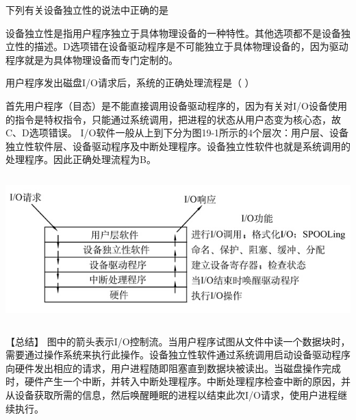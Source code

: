 \question 下列有关设备独立性的说法中正确的是
\par{}
\begin{solution}设备独立性是指用户程序独立于具体物理设备的一种特性。其他选项都不是设备独立性的描述。D选项错在设备驱动程序是不可能独立于具体物理设备的，因为驱动程序就是为具体物理设备而专门定制的。
\end{solution}
\question 用户程序发出磁盘I/O请求后，系统的正确处理流程是（ ）
\par{}
\begin{solution}首先用户程序（目态）是不能直接调用设备驱动程序的，因为有关对I/O设备使用的指令是特权指令，只能通过系统调用，把进程的状态从用户态变为核心态，故C、D选项错误。
I/O软件一般从上到下分为图19-1所示的4个层次：用户层、设备独立性软件层、设备驱动程序及中断处理程序。设备独立性软件也就是系统调用的处理程序。因此正确处理流程为B。
\includegraphics[width=6.77083in,height=2.51042in]{computerassets/6dbc4c72f9dd72ff8544000ba5bc7d05.jpeg}
【总结】
图中的箭头表示I/O控制流。当用户程序试图从文件中读一个数据块时，需要通过操作系统来执行此操作。设备独立性软件通过系统调用启动设备驱动程序向硬件发出相应的请求，用户进程随即阻塞直到数据块被读出。当磁盘操作完成时，硬件产生一个中断，并转入中断处理程序。中断处理程序检查中断的原因，并从设备获取所需的信息，然后唤醒睡眠的进程以结束此次I/O请求，使用户进程继续执行。
\end{solution}
